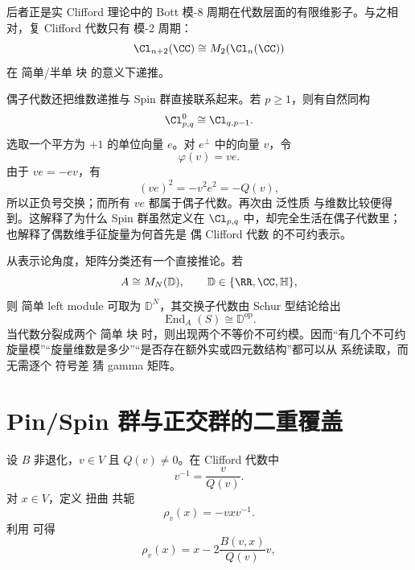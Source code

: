 后者正是实 Clifford 理论中的 Bott 模-8 周期在代数层面的有限维影子。与之相对，复 Clifford 代数只有 模-2 周期：
\[
\Cl_{n+2}(\CC)
\cong M_2\!\left(\Cl_{n}(\CC)\right)
\]
在 简单/半单 块 的意义下递推。

偶子代数还把维数递推与 Spin 群直接联系起来。若 $p\ge1$，则有自然同构
\begin{equation}
\Cl_{p,q}^{0}
\cong
\Cl_{q,p-1}.
\label{eq:clifford-even-subalgebra}
\end{equation}
选取一个平方为 $+1$ 的单位向量 $e$。对 $e^\perp$ 中的向量 $v$，令
\[
\varphi(v)=ve.
\]
由于 $ve=-ev$，有
\[
(ve)^2=-v^2e^2=-Q(v),
\]
所以正负号交换；而所有 $ve$ 都属于偶子代数。再次由 泛性质 与维数比较便得到。这解释了为什么 Spin 群虽然定义在 $\Cl_{p,q}$ 中，却完全生活在偶子代数里；也解释了偶数维手征旋量为何首先是 偶 Clifford 代数 的不可约表示。

从表示论角度，矩阵分类还有一个直接推论。若
\[
A\cong M_N(\mathbb D),
\qquad
\mathbb D\in\{\RR,\CC,\mathbb H\},
\]
则 简单 left module 可取为 $\mathbb D^N$，其交换子代数由 Schur 型结论给出
\[
\operatorname{End}_{A}(S)\cong\mathbb D^{\mathrm{op}}.
\]
当代数分裂成两个 简单 块 时，则出现两个不等价不可约模。因而“有几个不可约旋量模”“旋量维数是多少”“是否存在额外实或四元数结构”都可以从 系统读取，而无需逐个 符号差 猜 gamma 矩阵。

\section{Pin/Spin 群与正交群的二重覆盖}
\label{sec:pin-spin}
设 $B$ 非退化，$v\in V$ 且 $Q(v)\neq0$。在 Clifford 代数中
\[
v^{-1}=\frac{v}{Q(v)}.
\]
对 $x\in V$，定义 扭曲 共轭
\begin{equation*}\rho_v(x)=-vxv^{-1}.\end{equation*}
利用 可得
\begin{equation}
\rho_v(x)
=x-2\frac{B(v,x)}{Q(v)}v,
\label{eq:orthogonal-reflection}
\end{equation}

